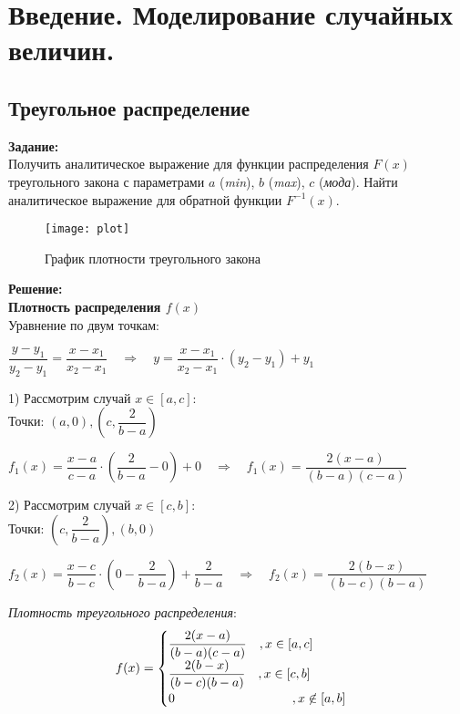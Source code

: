 \section*{Введение. Моделирование случайных величин.}
\subsection*{Треугольное распределение}

\textbf{Задание:}\\
Получить аналитическое выражение для функции распределения $F(x)$ треугольного закона с параметрами $a$ (\textit{min}), $b$ (\textit{max}), $c$ (\textit{мода}). Найти аналитическое выражение для обратной функции $F^{-1}(x)$.
\begin{figure}[h]
	\centering \texttt{[image: plot]}
	\caption{График плотности треугольного закона}
\end{figure}

\textbf{Решение:}\\
\textbf{Плотность распределения $f(x)$}\\
Уравнение по двум точкам:
\begin{center}
	$\dfrac{y-y_1}{y_2-y_1} = \dfrac{x-x_1}{x_2-x_1} \quad \Rightarrow \quad y = \dfrac{x-x_1}{x_2-x_1} \cdot (y_2-y_1) + y_1$
\end{center}

1) Рассмотрим случай $x \in [a, c]$:\\
\newline
Точки: $\left(a, 0\right), \left(c, \dfrac{2}{b-a}\right)$
\begin{center}
	$f_1(x) = \dfrac{x-a}{c-a} \cdot \left(\dfrac{2}{b-a} - 0\right) + 0 \quad \Rightarrow \quad f_1(x) = \dfrac{2(x-a)}{(b-a)(c-a)}$
\end{center}

2) Рассмотрим случай $x \in [c, b]$:\\
\newline
Точки: $\left(c, \dfrac{2}{b-a}\right), \left(b, 0\right)$
\begin{center}
	$f_2(x) = \dfrac{x-c}{b-c} \cdot \left(0 - \dfrac{2}{b-a}\right) + \dfrac{2}{b-a} \quad \Rightarrow \quad f_2(x) = \dfrac{2(b-x)}{(b-c)(b-a)}$
\end{center}

\newpage

\textit{Плотность треугольного распределения}:
\begin{align*}
	f(x) =
	\begin{cases}
		\dfrac{2(x-a)}{(b-a)(c-a)} \quad , x \in [a,c]\\
		\dfrac{2(b-x)}{(b-c)(b-a)} \quad , x \in [c,b]\\
		0 \hspace{3.25cm} , x \centernot\in [a,b]\\
	\end{cases}
\end{align*}

